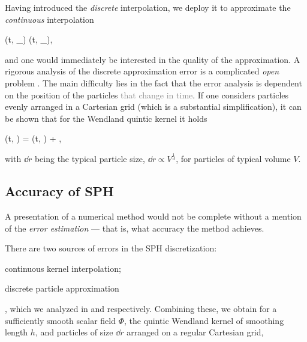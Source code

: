 \documentclass[../main.tex]{subfiles}
\begin{document}
Having introduced the \emph{discrete} interpolation, we deploy it to approximate the \emph{continuous} interpolation

\begin{equations}[single,*]
	\sphc{\Phi}\left(t, _{\alpha}\right) \approx \sphd{\Phi}\left(t, _{\alpha}\right),
\end{equations}

and one would immediately be interested in the quality of the approximation. A rigorous analysis of the discrete approximation error is a complicated \emph{open} problem \autocite[p.~3]{vacondioGrandChallengesSmoothed2021a}\autocite{quinlanTruncationErrorMeshfree2006}. The main difficulty lies in the fact that the error analysis is dependent on the position of the particles \textcolor{gray}{that change in time}.
If one considers particles evenly arranged in a Cartesian grid (which is a substantial simplification), it can be shown that for the Wendland quintic kernel it holds

\begin{equations}[single,!,numberline=all]
\label{eq:DIS-ERROR}
\sphd{\Phi}\left(t, \right) = \sphc{\Phi}\left(t, \right) + ,
\end{equations}
with $\dd{r}$ being the typical particle size, \ie $\dd{r} \propto V^{\frac{1}{d}}$, for particles of typical volume $V$.

\subsection{Accuracy of SPH}
\label{sec:ACCURACY}

A presentation of a numerical method would not be complete without a mention of the \emph{error estimation} --- that is, what accuracy the method achieves. 

There are two sources of errors in the SPH discretization: \begin{inparaenum} \item continuous kernel interpolation; \item discrete particle approximation \end{inparaenum}, which we analyzed in  and  respectively. Combining these, we obtain for a sufficiently smooth scalar field $\Phi$, the quintic Wendland kernel of smoothing length $h$, and particles of size $\dd{r}$ arranged on a regular Cartesian grid,
\end{document}
